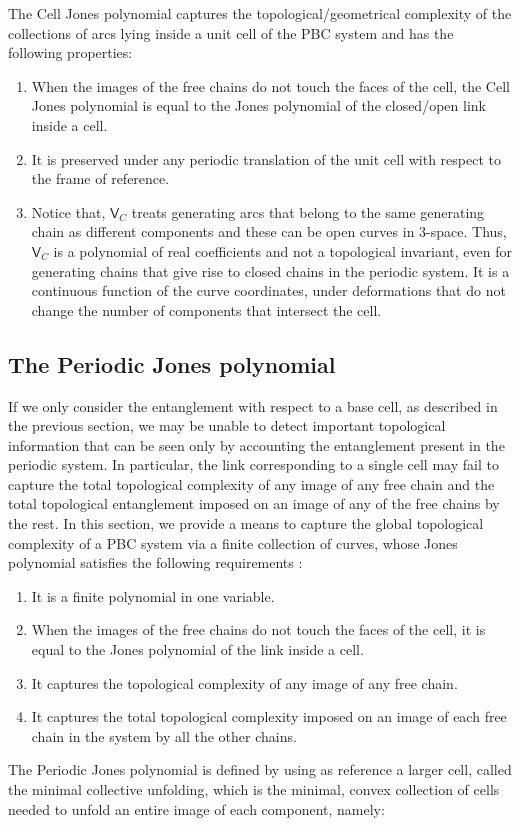 \documentclass{article}
\begin{document}
The Cell Jones polynomial captures the topological/geometrical complexity of the collections of arcs lying inside a unit cell of the PBC system and has the following properties:
 
\begin{enumerate}
    \item When the images of the free chains do not touch the faces of the cell, the Cell Jones polynomial is equal to the Jones polynomial of the closed/open link inside a cell.
    \item It is preserved under any periodic translation of the unit cell with respect to the frame of reference.
    \item Notice that, $\mathsf{V}_C$ treats generating arcs that belong to the same generating chain as different components and these can be open curves in 3-space. Thus, $\mathsf{V}_C$ is a polynomial of real coefficients and not a topological invariant, even for generating chains that give rise to closed chains in the periodic system. It is a continuous function of the curve coordinates,  under deformations that do not change the number of components that intersect the cell.
\end{enumerate}


\subsection{The Periodic Jones polynomial}\label{Jones_periodic}

If we only consider the entanglement with respect to a base cell, as described in the previous section, we may be unable to detect important topological information that can be seen only by accounting the entanglement present in the periodic system. In particular, the link corresponding to a single cell may fail to capture the total topological complexity of any image of any free chain and the total topological entanglement imposed on an image of any of the free chains by the rest. In this section, we provide a means to capture the global topological complexity of a PBC system via a finite collection of curves, whose Jones polynomial satisfies the following requirements :
\begin{enumerate}
    \item It is a finite polynomial in one variable.
    \item When the images of the free chains do not touch the faces of the cell, it is equal to the Jones polynomial of the link inside a cell.
    \item It captures the topological complexity of any image of any free chain.
    \item It captures the total topological complexity imposed on an image of each free chain in the system by all the other chains.
    
\end{enumerate}
The Periodic Jones polynomial is defined by using as reference a larger cell, called the minimal collective unfolding, which is the minimal, convex collection of cells needed to unfold an entire image of each component, namely:
\end{document}
